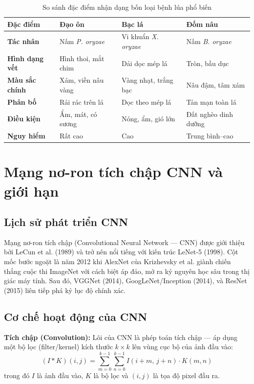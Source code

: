 \documentclass[13pt,a4paper]{extreport}
\begin{document}
\begin{table}[H]
\centering
\small
\caption{So sánh đặc điểm nhận dạng bốn loại bệnh lúa phổ biến}
\label{tab:disease_comparison}
\setlength{\tabcolsep}{4pt}
\begin{tabular}{>{\bfseries}p{2.6cm} p{3.2cm} p{3.2cm} p{3.2cm}}
\toprule
\textbf{Đặc điểm} & \textbf{Đạo ôn} & \textbf{Bạc lá} & \textbf{Đốm nâu} \\
\midrule
Tác nhân & Nấm \textit{P. oryzae} & Vi khuẩn \textit{X. oryzae} & Nấm \textit{B. oryzae} \\[4pt]
Hình dạng vết & Hình thoi, mắt chim & Dải dọc mép lá & Tròn, bầu dục \\[4pt]
Màu sắc chính & Xám, viền nâu vàng & Vàng nhạt, trắng bạc & Nâu đậm, tâm xám \\[4pt]
Phân bố & Rải rác trên lá & Dọc theo mép lá & Tản mạn toàn lá \\[4pt]
Điều kiện & Ẩm, mát, có sương & Nóng, ẩm, gió lớn & Đất nghèo dinh dưỡng \\[4pt]
Nguy hiểm & Rất cao & Cao & Trung bình--cao \\
\bottomrule
\end{tabular}
\end{table}

\section{Mạng nơ-ron tích chập CNN và giới hạn}

\subsection{Lịch sử phát triển CNN}
Mạng nơ-ron tích chập (Convolutional Neural Network --- CNN) được giới thiệu bởi LeCun et al. (1989) và trở nên nổi tiếng với kiến trúc LeNet-5 (1998). Cột mốc bước ngoặt là năm 2012 khi AlexNet của Krizhevsky et al. giành chiến thắng cuộc thi ImageNet với cách biệt áp đảo, mở ra kỷ nguyên học sâu trong thị giác máy tính. Sau đó, VGGNet (2014), GoogLeNet/Inception (2014), và ResNet (2015) liên tiếp phá kỷ lục độ chính xác.

\subsection{Cơ chế hoạt động của CNN}
\textbf{Tích chập (Convolution):} Lõi của CNN là phép toán tích chập --- áp dụng một bộ lọc (filter/kernel) kích thước $k \times k$ lên vùng cục bộ của ảnh đầu vào:
\begin{equation}
    (I * K)(i,j) = \sum_{m=0}^{k-1} \sum_{n=0}^{k-1} I(i+m,\, j+n) \cdot K(m,n)
    \label{eq:convolution}
\end{equation}
trong đó $I$ là ảnh đầu vào, $K$ là bộ lọc và $(i,j)$ là tọa độ pixel đầu ra.
\end{document}
